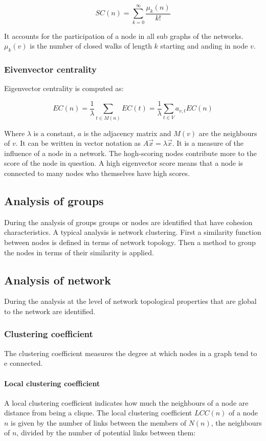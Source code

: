 		$$SC(n) = \sum\limits_{k=0}^\infty \frac{\mu_k(n)}{k!}$$

		It accounts for the participation of a node in all sub graphs of the networks.
		$\mu_k(v)$ is the number of closed walks of length $k$ starting and anding in node $v$.

		\subsubsection{Eivenvector centrality}
		Eigenvector centrality is computed as:

		$$EC(n) = \frac{1}{\lambda}\sum\limits_{t\in M(n)} EC(t) = \frac{1}{\lambda}\sum\limits_{t\in V} a_{v,t}EC(n)$$

		Where $\lambda$ is a constant, $a$ is the adjacency matrix and $M(v)$ are the neighbours of $v$.
		It can be written in vector notation as $A\vec{x} = \lambda\vec{x}$.
		It is a measure of the influence of a node in a network.
		The hogh-scoring nodes contribute more to the score of the node in question.
		A high eigenvector score means that a node is connected to many nodes who themselves have high scores.

	\subsection{Analysis of groups}
	During the analysis of groups groups or nodes are identified that have cohesion characteristics.
	A typical analysis is network clustering.
	First a similarity function between nodes is defined in terms of network topology.
	Then a method to group the nodes in terms of their similarity is applied.

	\subsection{Analysis of network}
	During the analysis at the level of network topological properties that are global to the network are identified.

		\subsubsection{Clustering coefficient}
		The clustering coefficient measures the degree at which nodes in a graph tend to e connected.

			\paragraph{Local clustering coefficient}
			A local clustering coefficient indicates how much the neighbours of a node are distance from being a clique.
			The local clustering coefficient $LCC(n)$ of a node $n$ is given by the number of links between the members of $N(n)$, the neighbours of $n$, divided by the number of potential links between them:

